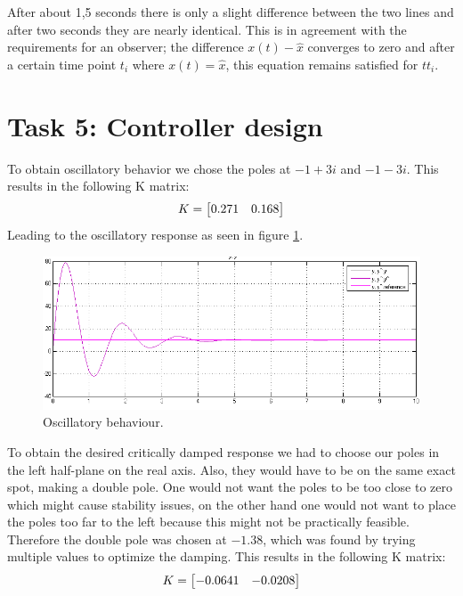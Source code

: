 \documentclass[final]{scrreprt} %
\begin{document}
After about 1,5 seconds there is only a slight difference between the two lines and after two seconds they are nearly identical. This is in agreement with the requirements for an observer; the difference $x(t)-\hat{x}$ converges to zero and after a certain time point $t_i$ where $x(t) = \hat{x}$, this equation remains satisfied for $t$\geq $t_i$.

\section*{Task 5: Controller design}

To obtain oscillatory behavior we chose the poles at $-1 + 3i$ and $-1 - 3i$. This results in the following K matrix:
\begin{equation}
\centering
K = 
\begin{bmatrix}
  0.271 & 0.168
\end{bmatrix}
\end{equation}
Leading to the oscillatory response as seen in figure \ref{fig:oscillatory}.

\begin{figure}[h!]
\centering
\includegraphics[scale = 0.5]{res/osc-res.png}
\caption{Oscillatory behaviour.}
\label{fig:oscillatory}
\end{figure}

To obtain the desired critically damped response we had to choose our poles in the left half-plane on the real axis. Also, they would have to be on the same exact spot, making a double pole. One would not want the poles to be too close to zero which might cause stability issues, on the other hand one would not want to place the poles too far to the left because this might not be practically feasible. Therefore the double pole was chosen at $-1.38$, which was found by trying multiple values to optimize the damping. This results in the following K matrix:
\begin{equation}
\centering
K =
\begin{bmatrix}
  -0.0641 & -0.0208
\end{bmatrix}
\end{equation}
\end{document}
